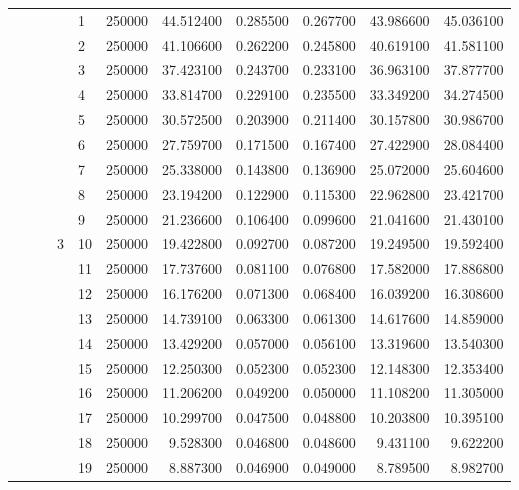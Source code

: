 \begin{tabular}{llllllrrrrr}
\cline{4-11} \cline{5-11}
 &  &  & \multirow[t]{25}{*}{3} & 1 & 250000 & 44.512400 & 0.285500 & 0.267700 & 43.986600 & 45.036100 \\
\cline{5-11}
 &  &  &  & 2 & 250000 & 41.106600 & 0.262200 & 0.245800 & 40.619100 & 41.581100 \\
\cline{5-11}
 &  &  &  & 3 & 250000 & 37.423100 & 0.243700 & 0.233100 & 36.963100 & 37.877700 \\
\cline{5-11}
 &  &  &  & 4 & 250000 & 33.814700 & 0.229100 & 0.235500 & 33.349200 & 34.274500 \\
\cline{5-11}
 &  &  &  & 5 & 250000 & 30.572500 & 0.203900 & 0.211400 & 30.157800 & 30.986700 \\
\cline{5-11}
 &  &  &  & 6 & 250000 & 27.759700 & 0.171500 & 0.167400 & 27.422900 & 28.084400 \\
\cline{5-11}
 &  &  &  & 7 & 250000 & 25.338000 & 0.143800 & 0.136900 & 25.072000 & 25.604600 \\
\cline{5-11}
 &  &  &  & 8 & 250000 & 23.194200 & 0.122900 & 0.115300 & 22.962800 & 23.421700 \\
\cline{5-11}
 &  &  &  & 9 & 250000 & 21.236600 & 0.106400 & 0.099600 & 21.041600 & 21.430100 \\
\cline{5-11}
 &  &  &  & 10 & 250000 & 19.422800 & 0.092700 & 0.087200 & 19.249500 & 19.592400 \\
\cline{5-11}
 &  &  &  & 11 & 250000 & 17.737600 & 0.081100 & 0.076800 & 17.582000 & 17.886800 \\
\cline{5-11}
 &  &  &  & 12 & 250000 & 16.176200 & 0.071300 & 0.068400 & 16.039200 & 16.308600 \\
\cline{5-11}
 &  &  &  & 13 & 250000 & 14.739100 & 0.063300 & 0.061300 & 14.617600 & 14.859000 \\
\cline{5-11}
 &  &  &  & 14 & 250000 & 13.429200 & 0.057000 & 0.056100 & 13.319600 & 13.540300 \\
\cline{5-11}
 &  &  &  & 15 & 250000 & 12.250300 & 0.052300 & 0.052300 & 12.148300 & 12.353400 \\
\cline{5-11}
 &  &  &  & 16 & 250000 & 11.206200 & 0.049200 & 0.050000 & 11.108200 & 11.305000 \\
\cline{5-11}
 &  &  &  & 17 & 250000 & 10.299700 & 0.047500 & 0.048800 & 10.203800 & 10.395100 \\
\cline{5-11}
 &  &  &  & 18 & 250000 & 9.528300 & 0.046800 & 0.048600 & 9.431100 & 9.622200 \\
\cline{5-11}
 &  &  &  & 19 & 250000 & 8.887300 & 0.046900 & 0.049000 & 8.789500 & 8.982700 \\

\end{tabular}
